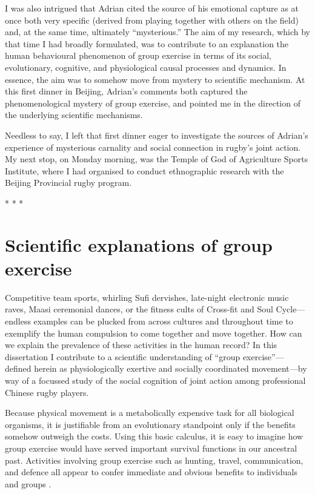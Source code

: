 \begin{CJK}{UTF8}{gbsn}
I was also intrigued that Adrian cited the source of his emotional capture as at once both very specific (derived from playing together with others on the field) and, at the same time, ultimately ``mysterious.''  The aim of my research, which by that time I had broadly formulated, was to contribute to an explanation the human behavioural phenomenon of group exercise in terms of its social, evolutionary, cognitive, and physiological causal processes and dynamics.  In essence, the aim was to somehow move from mystery to scientific mechanism.  At this first dinner in Beijing, Adrian's comments both captured the phenomenological mystery of group exercise, and pointed me in the direction of the underlying scientific mechanisms.

Needless to say, I left that first dinner eager to investigate the sources of Adrian's experience of mysterious carnality and social connection in rugby's joint action.  My next stop, on Monday morning, was the Temple of God of Agriculture Sports Institute, where I had organised to conduct ethnographic research with the Beijing Provincial rugby program.


                            \begin{center}
                              * * *
                            \end{center}





\section{Scientific explanations of group exercise}
Competitive team sports, whirling Sufi dervishes, late-night electronic music raves, Maasi ceremonial dances, or the fitness cults of Cross-fit and Soul Cycle---endless examples can be plucked from across cultures and throughout time to exemplify the human compulsion to come together and move together.  How can we explain the prevalence of these activities in the human record?  In this dissertation I contribute to a scientific understanding of ``group exercise''---defined herein as physiologically exertive and socially coordinated movement---by way of a focussed study of the social cognition of joint action among professional Chinese rugby players.

Because physical movement is a metabolically expensive task for all biological organisms, it is justifiable from an evolutionary standpoint only if the benefits somehow outweigh the costs.  Using this basic calculus, it is easy to imagine how group exercise would have served important survival functions in our ancestral past.  Activities involving group exercise such as hunting, travel, communication, and defence all appear to confer immediate and obvious benefits to individuals and groups \citep{Sands2010}.


\end{CJK}
